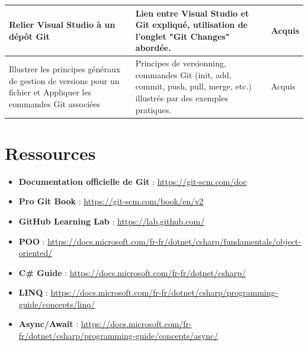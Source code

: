 \begin{center}
\begin{tabular}{|p{}|p{}|m{}|}
Relier Visual Studio à un dépôt Git &
Lien entre Visual Studio et Git expliqué, utilisation de l'onglet "Git Changes" abordée. &
{\color{green!60!black}Acquis} \\ \hline

Illustrer les principes généraux de gestion de versions pour un fichier et Appliquer les commandes Git associées &
Principes de versionning, commandes Git (init, add, commit, push, pull, merge, etc.) illustrés par des exemples pratiques. &
{\color{green!60!black}Acquis} \\ \hline

\end{tabular}
\end{center}

\section*{Ressources}

\begin{itemize}
	\item \textbf{Documentation officielle de Git} : \url{https://git-scm.com/doc}
	\item \textbf{Pro Git Book} : \url{https://git-scm.com/book/en/v2}
	\item \textbf{GitHub Learning Lab} : \url{https://lab.github.com/}
	\item \textbf{POO} : \url{https://docs.microsoft.com/fr-fr/dotnet/csharp/fundamentals/object-oriented/}
	\item \textbf{C\# Guide} : \url{https://docs.microsoft.com/fr-fr/dotnet/csharp/}
	\item \textbf{LINQ} : \url{https://docs.microsoft.com/fr-fr/dotnet/csharp/programming-guide/concepts/linq/}
	\item \textbf{Async/Await} : \url{https://docs.microsoft.com/fr-fr/dotnet/csharp/programming-guide/concepts/async/}
\end{itemize}
